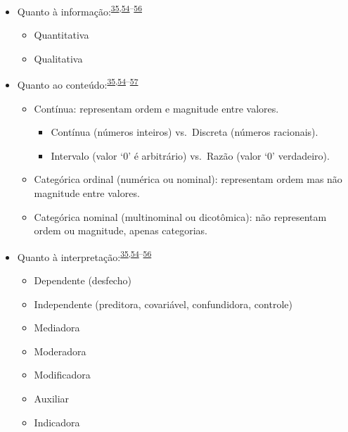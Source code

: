 \documentclass[
  a4paper,
]{book}
\begin{document}
\begin{itemize}
\item
  Quanto à informação:\textsuperscript{\protect\hyperlink{ref-vetter2017}{35},\protect\hyperlink{ref-Ali2016}{54}--\protect\hyperlink{ref-kaliyadan2019}{56}}

  \begin{itemize}
  \item
    Quantitativa
  \item
    Qualitativa
  \end{itemize}
\item
  Quanto ao conteúdo:\textsuperscript{\protect\hyperlink{ref-vetter2017}{35},\protect\hyperlink{ref-Ali2016}{54}--\protect\hyperlink{ref-barkan2015}{57}}

  \begin{itemize}
  \item
    Contínua: representam ordem e magnitude entre valores.

    \begin{itemize}
    \item
      Contínua (números inteiros) vs.~Discreta (números racionais).
    \item
      Intervalo (valor `0' é arbitrário) vs.~Razão (valor `0' verdadeiro).
    \end{itemize}
  \item
    Categórica ordinal (numérica ou nominal): representam ordem mas não magnitude entre valores.
  \item
    Categórica nominal (multinominal ou dicotômica): não representam ordem ou magnitude, apenas categorias.
  \end{itemize}
\item
  Quanto à interpretação:\textsuperscript{\protect\hyperlink{ref-vetter2017}{35},\protect\hyperlink{ref-Ali2016}{54}--\protect\hyperlink{ref-kaliyadan2019}{56}}

  \begin{itemize}
  \item
    Dependente (desfecho)
  \item
    Independente (preditora, covariável, confundidora, controle)
  \item
    Mediadora
  \item
    Moderadora
  \item
    Modificadora
  \item
    Auxiliar
  \item
    Indicadora
  \end{itemize}
\end{itemize}
\end{document}

